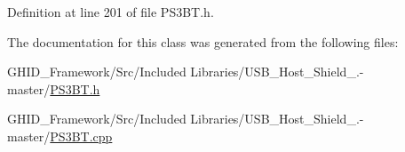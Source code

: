 \-Definition at line 201 of file \-P\-S3\-B\-T.\-h.



\-The documentation for this class was generated from the following files\-:\begin{DoxyCompactItemize}
\item 
\-G\-H\-I\-D\-\_\-\-Framework/\-Src/\-Included Libraries/\-U\-S\-B\-\_\-\-Host\-\_\-\-Shield\-\_.-\/master/\hyperlink{_p_s3_b_t_8h}{\-P\-S3\-B\-T.\-h}\item 
\-G\-H\-I\-D\-\_\-\-Framework/\-Src/\-Included Libraries/\-U\-S\-B\-\_\-\-Host\-\_\-\-Shield\-\_.-\/master/\hyperlink{_p_s3_b_t_8cpp}{\-P\-S3\-B\-T.\-cpp}\end{DoxyCompactItemize}
